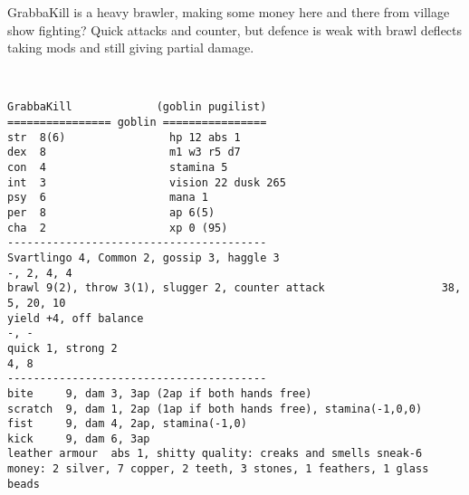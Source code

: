 \goodbreak
\begin{samepage}

\noindent GrabbaKill is a heavy brawler, making some money here and there from village show fighting? Quick attacks and counter, but defence is weak with brawl deflects taking mods and still giving partial damage.

\

\small \begin{verbatim}
GrabbaKill             (goblin pugilist)
================ goblin ================
str  8(6)                hp 12 abs 1
dex  8                   m1 w3 r5 d7
con  4                   stamina 5
int  3                   vision 22 dusk 265
psy  6                   mana 1
per  8                   ap 6(5)
cha  2                   xp 0 (95)
----------------------------------------
Svartlingo 4, Common 2, gossip 3, haggle 3                            -, 2, 4, 4
brawl 9(2), throw 3(1), slugger 2, counter attack                  38, 5, 20, 10
yield +4, off balance                                                       -, -
quick 1, strong 2                                                           4, 8
----------------------------------------
bite     9, dam 3, 3ap (2ap if both hands free)
scratch  9, dam 1, 2ap (1ap if both hands free), stamina(-1,0,0)
fist     9, dam 4, 2ap, stamina(-1,0)
kick     9, dam 6, 3ap
leather armour  abs 1, shitty quality: creaks and smells sneak-6
money: 2 silver, 7 copper, 2 teeth, 3 stones, 1 feathers, 1 glass beads
\end{verbatim} \end{samepage} \normalsize





